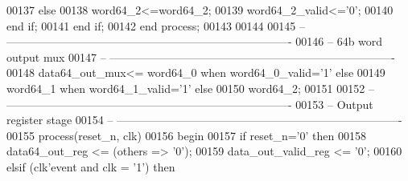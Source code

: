 \begin{DoxyCode}
00137             \textcolor{keywordflow}{else} 
00138                 \textcolor{vhdlchar}{word64_2}\textcolor{vhdlchar}{<=}\textcolor{vhdlchar}{word64_2};
00139             \textcolor{vhdlchar}{word64_2_valid}\textcolor{vhdlchar}{<=}\textcolor{vhdlchar}{'}\textcolor{vhdllogic}{}\textcolor{vhdllogic}{0}\textcolor{vhdlchar}{'};
00140             \textcolor{keywordflow}{end} \textcolor{keywordflow}{if};
00141         \textcolor{keywordflow}{end} \textcolor{keywordflow}{if};
00142     \textcolor{keywordflow}{end} \textcolor{keywordflow}{process};
00143 
00144 
00145 \textcolor{keyword}{-- ----------------------------------------------------------------------------}
00146 \textcolor{keyword}{-- 64b word output mux}
00147 \textcolor{keyword}{-- ----------------------------------------------------------------------------}
00148 \textcolor{vhdlchar}{data64_out_mux}\textcolor{vhdlchar}{<=}    \textcolor{vhdlchar}{word64_0} \textcolor{keywordflow}{when} \textcolor{vhdlchar}{word64_0_valid}\textcolor{vhdlchar}{=}\textcolor{vhdlchar}{'}\textcolor{vhdllogic}{}\textcolor{vhdllogic}{1}\textcolor{vhdlchar}{'} \textcolor{keywordflow}{else} 
00149                   \textcolor{vhdlchar}{word64_1} \textcolor{keywordflow}{when} \textcolor{vhdlchar}{word64_1_valid}\textcolor{vhdlchar}{=}\textcolor{vhdlchar}{'}\textcolor{vhdllogic}{}\textcolor{vhdllogic}{1}\textcolor{vhdlchar}{'} \textcolor{keywordflow}{else}
00150                   \textcolor{vhdlchar}{word64_2};
00151 
00152 \textcolor{keyword}{-- ----------------------------------------------------------------------------}
00153 \textcolor{keyword}{-- Output register stage}
00154 \textcolor{keyword}{-- ----------------------------------------------------------------------------                  }
00155   \textcolor{keywordflow}{process}(reset_n, clk)
00156 \textcolor{vhdlkeyword}{    begin}
00157       \textcolor{keywordflow}{if} \textcolor{vhdlchar}{reset_n}\textcolor{vhdlchar}{=}\textcolor{vhdlchar}{'}\textcolor{vhdllogic}{}\textcolor{vhdllogic}{0}\textcolor{vhdlchar}{'} \textcolor{keywordflow}{then}
00158          \textcolor{vhdlchar}{data64_out_reg}       \textcolor{vhdlchar}{<=} \textcolor{vhdlchar}{(}\textcolor{keywordflow}{others} \textcolor{vhdlchar}{=}\textcolor{vhdlchar}{>} \textcolor{vhdlchar}{'}\textcolor{vhdllogic}{}\textcolor{vhdllogic}{0}\textcolor{vhdlchar}{'}\textcolor{vhdlchar}{)};
00159             \textcolor{vhdlchar}{data_out_valid_reg}   \textcolor{vhdlchar}{<=} \textcolor{vhdlchar}{'}\textcolor{vhdllogic}{}\textcolor{vhdllogic}{0}\textcolor{vhdlchar}{'};        
00160       \textcolor{keywordflow}{elsif} \textcolor{vhdlchar}{(}\textcolor{vhdlchar}{clk}\textcolor{vhdlchar}{'}\textcolor{vhdlkeyword}{event} \textcolor{keywordflow}{and} \textcolor{vhdlchar}{clk} \textcolor{vhdlchar}{=} \textcolor{vhdlchar}{'}\textcolor{vhdllogic}{}\textcolor{vhdllogic}{1}\textcolor{vhdlchar}{'}\textcolor{vhdlchar}{)} \textcolor{keywordflow}{then}

\end{DoxyCode}
